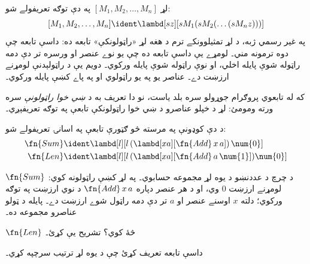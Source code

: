 \documentclass[../../../include/open-logic-section]{subfiles}
\begin{document}

لړ $[M_1, M_2, \ldots, M_n]$ په دې توګه تعريفولے شو:
\[
  [M_1, M_2, \ldots, M_n] \ident \lambd[sz][s M_1 (s M_2 (\ldots (s M_n z)))]
\]
په غير رسمي ژبه، د لړ تمثيلوونکے ترم د هغه لړ «راټولونکې» تابعه ده: داسې تابعه چې دوه ترمونه مني۔ لومړے يې داسې تابعه ده چې يو نوے عنصر او ورسره تر دې دمه راټوله شوې پايله اخلي، او نوې راټوله شوې پايله ورکوي۔ دويم يې د راټولېدنې لومړنے ارزښت دے۔ عناصر يو په يو راټولوي او په پاے کښې پايله ورکوي۔

\begin{digress}
که له تابعوي پروګرام جوړولو سره بلد ياست، نو دا تعريف به د \emph{ښي خوا راټولونې} سره ورته ومومئ: لړ د خپلو عناصرو د ښي خوا راټولونکې تابعې په توګه تعريفېږي۔
\end{digress}

د دې کوډونې په مرسته څو ګټورې تابعې په اسانۍ تعريفولے شو:
\begin{align*}
  \fn{Sum} & \ident
  \lambd[l][l \, (\lambd[xa][\fn{Add} \, x \, a])\,  \num{0}]\\
  \fn{Len} & \ident
  \lambd[l][l \, (\lambd[xa][\fn{Add} \, a \, \num{1}]) \num{0}]
\end{align*}

$\fn{Sum}$ د چرچ د عددنښو د يوه لړ مجموعه حسابوي۔ په لړ کښې راټولونه کوي: لومړنے ارزښت $\num{0}$ وي، او د هر عنصر دپاره $\fn{Add} \, x\, a$ د نوي ارزښت په توګه ورکوي؛ دلته $x$ اوسنے عنصر او $a$ تر دې دمه راټول شوے ارزښت دے۔ پايله د ټولو عناصرو مجموعه ده۔

\begin{prob}
  $\fn{Len}$ څۀ کوي؟ تشريح يې کړئ۔
\end{prob}

\begin{prob}
  داسې تابعه تعريف کړئ چې د يوه لړ ترتيب سرچپه کړي۔
\end{prob}
\end{document}

